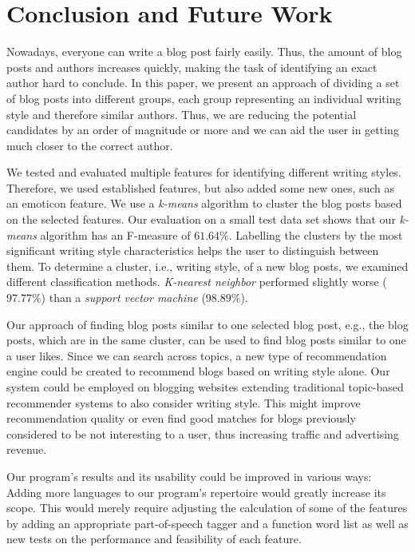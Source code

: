 \section{Conclusion and Future Work}
\label{sec:conclusion}


Nowadays, everyone can write a blog post fairly easily.
Thus, the amount of blog posts and authors increases quickly, making the task of identifying an exact author hard to conclude.
In this paper, we present an approach of dividing a set of blog posts into different groups, each group representing an individual writing style and therefore similar authors.
Thus, we are reducing the potential candidates by an order of magnitude or more and we can aid the user in getting much closer to the correct author.


We tested and evaluated multiple features for identifying different writing styles.
Therefore, we used established features, but also added some new ones, such as an emoticon feature.
We use a \textit{k-means} algorithm to cluster the blog posts based on the selected features.
Our evaluation on a small test data set shows that our \textit{k-means} algorithm has an F-measure of $61.64\%$.
Labelling the clusters by the most significant writing style characteristics helps the user to distinguish between them.
To determine a cluster, i.e., writing style, of a new blog posts, we examined different classification methods.
\textit{K-nearest neighbor} performed slightly worse ($97.77\%$) than a \textit{support vector machine} ($98.89\%$).


Our approach of finding blog posts similar to one selected blog post, e.g., the blog posts, which are in the same cluster, can be used to find blog posts similar to one a user likes.
Since we can search across topics, a new type of recommendation engine could be created to recommend blogs based on writing style alone.
Our system could be employed on blogging websites extending traditional topic-based recommender systems to also consider writing style.
This might improve recommendation quality or even find good matches for blogs previously considered to be not interesting to a user, thus increasing traffic and advertising revenue.


Our program's results and its usability could be improved in various ways: Adding more languages to our program’s repertoire would greatly increase its scope.
This would merely require adjusting the calculation of some of the features by adding an appropriate part-of-speech tagger and a function word list as well as new tests on the performance and feasibility of each feature.


